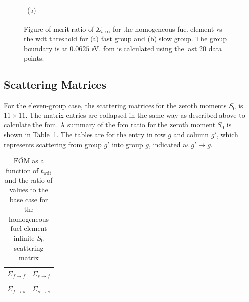 \begin{figure}[hbtp]
\begin{tabular}{c}
    (b) 
  \end{tabular}
  \caption[Figure of merit ratio of the $\Sigma_{t,\infty}$ for the
  homogeneous fuel element]{Figure of merit ratio of
    $\Sigma_{t,\infty}$ for the homogeneous fuel element vs the \gls{wdt}
    threshold for (a) fast group and (b) slow group. The group
    boundary is at $0.0625$ eV. \gls{fom} is calculated using the last
    20 data points.}
  \label{fig:homog_inf_tot}
\end{figure}

\subsection{Scattering Matrices}
\label{sec:homog_inf_sp0}

For the eleven-group case, the scattering matrices for the zeroth
moments $S_0$ is $11 \times 11$. The matrix entries are collapsed in
the same way as described above to calculate the \gls{fom}. A summary
of the \gls{fom} ratio for the zeroth moment $S_0$ is shown in
Table~\ref{tab:homog_inf_sp0}. The tables are for the entry in row $g$
and column $g'$, which represents scattering from group $g'$ into
group $g$, indicated as $g' \to g$.

\begin{table}[hbtp]
  \centering
  \caption[$\overline{\mathrm{FOM}}$ and ratio for
  the homogeneous fuel element infinite $S_0$ scattering matrix.]{$\overline{\mathrm{FOM}}$ as a function of
    $t_{\mathrm{wdt}}$ and the ratio of values to the base case for
    the homogeneous fuel element infinite $S_0$ scattering matrix}
  \begin{tabular}{cc} $\Sigma_{f\to f}$ & $\Sigma_{s \to f}$ \\
 & 
 \\
$\Sigma_{f\to s}$ & $\Sigma_{s \to s}$ \\
 & 
 
  \end{tabular}
  \label{tab:homog_inf_sp0}
\end{table}

